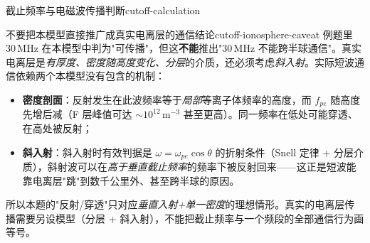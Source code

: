 \begin{example}{截止频率与电磁波传播判断}{cutoff-calculation}
\begin{warning}{不要把本模型直接推广成真实电离层的通信结论}{cutoff-ionosphere-caveat}
例题里 $30\,\mathrm{MHz}$ 在本模型中判为"可传播"，但这\textbf{不能}推出"$30\,\mathrm{MHz}$ 不能跨半球通信"。真实电离层是\emph{有厚度、密度随高度变化、分层}的介质，还必须考虑\emph{斜入射}。实际短波通信依赖两个本模型没有包含的机制：
\begin{itemize}
\item \textbf{密度剖面}：反射发生在此波频率等于\emph{局部}等离子体频率的高度，而 $f_{pe}$ 随高度先增后减（F 层峰值可达 $\sim10^{12}\,\mathrm{m^{-3}}$ 甚至更高）。同一频率在低处可能穿透、在高处被反射；
\item \textbf{斜入射}：斜入射时有效判据是 $\omega=\omega_{pe}\cos\theta$ 的折射条件（Snell 定律 + 分层介质），斜射波可以在\emph{高于垂直截止频率}的频率下被反射回来——这正是短波能靠电离层"跳"到数千公里外、甚至跨半球的原因。
\end{itemize}
所以本题的"反射/穿透"只对应\emph{垂直入射+单一密度}的理想情形。真实的电离层传播需要另设模型（分层 + 斜入射），不能把截止频率与一个频段的全部通信行为画等号。
\end{warning}
\end{example}

